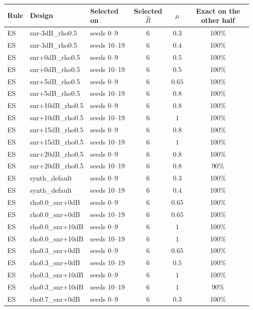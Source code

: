 \begin{longtable}{@{}lllccc@{}}
\toprule
Rule & Design & Selected on & Selected \(\hat R\) & \(\mu\) & Exact on the other half \\
\midrule
\endhead
ES & snr-3dB\_rho0.5 & seeds 0--9 & \(6\) & \(0.3\) & 100\% \\
ES & snr-3dB\_rho0.5 & seeds 10--19 & \(6\) & \(0.4\) & 100\% \\
ES & snr+0dB\_rho0.5 & seeds 0--9 & \(6\) & \(0.5\) & 100\% \\
ES & snr+0dB\_rho0.5 & seeds 10--19 & \(6\) & \(0.5\) & 100\% \\
ES & snr+5dB\_rho0.5 & seeds 0--9 & \(6\) & \(0.65\) & 100\% \\
ES & snr+5dB\_rho0.5 & seeds 10--19 & \(6\) & \(0.8\) & 100\% \\
ES & snr+10dB\_rho0.5 & seeds 0--9 & \(6\) & \(0.8\) & 100\% \\
ES & snr+10dB\_rho0.5 & seeds 10--19 & \(6\) & \(1\) & 100\% \\
ES & snr+15dB\_rho0.5 & seeds 0--9 & \(6\) & \(0.8\) & 100\% \\
ES & snr+15dB\_rho0.5 & seeds 10--19 & \(6\) & \(1\) & 100\% \\
ES & snr+20dB\_rho0.5 & seeds 0--9 & \(6\) & \(0.8\) & 100\% \\
ES & snr+20dB\_rho0.5 & seeds 10--19 & \(6\) & \(0.8\) & 90\% \\
ES & synth\_default & seeds 0--9 & \(6\) & \(0.3\) & 100\% \\
ES & synth\_default & seeds 10--19 & \(6\) & \(0.4\) & 100\% \\
ES & rho0.0\_snr+0dB & seeds 0--9 & \(6\) & \(0.65\) & 100\% \\
ES & rho0.0\_snr+0dB & seeds 10--19 & \(6\) & \(0.65\) & 100\% \\
ES & rho0.0\_snr+10dB & seeds 0--9 & \(6\) & \(1\) & 100\% \\
ES & rho0.0\_snr+10dB & seeds 10--19 & \(6\) & \(1\) & 100\% \\
ES & rho0.3\_snr+0dB & seeds 0--9 & \(6\) & \(0.65\) & 100\% \\
ES & rho0.3\_snr+0dB & seeds 10--19 & \(6\) & \(0.5\) & 100\% \\
ES & rho0.3\_snr+10dB & seeds 0--9 & \(6\) & \(1\) & 100\% \\
ES & rho0.3\_snr+10dB & seeds 10--19 & \(6\) & \(1\) & 90\% \\
ES & rho0.7\_snr+0dB & seeds 0--9 & \(6\) & \(0.3\) & 100\% \\

\end{longtable}
